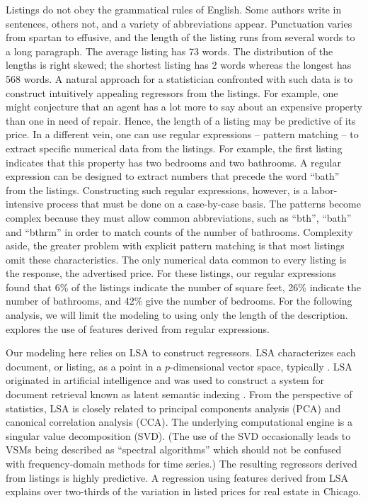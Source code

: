 \documentclass[12pt]{article}
\begin{document}
 \noindent
 Listings do not obey the grammatical rules of English.  Some authors write in
 sentences, others not, and a variety of abbreviations appear.  Punctuation
 varies from spartan to effusive, and the length of the listing runs from
 several words to a long paragraph.  The average listing has 73 words. The
 distribution of the lengths is right skewed; the shortest listing has 2 words
 whereas the longest has 568 words.  A natural approach for a statistician
 confronted with such data is to construct intuitively appealing regressors from
 the listings.  For example, one might conjecture that an agent has a lot more
 to say about an expensive property than one in need of repair.  Hence, the
 length of a listing may be predictive of its price.  In a different vein, one
 can use regular expressions -- pattern matching -- to extract specific
 numerical data from the listings.  For example, the first listing indicates
 that this property has two bedrooms and two bathrooms.  A regular expression
 can be designed to extract numbers that precede the word ``bath'' from the
 listings.  Constructing such regular expressions, however, is a labor-intensive
 process that must be done on a case-by-case basis.  The patterns become complex
 because they must allow common abbreviations, such as ``bth'', ``bath'' and
 ``bthrm'' in order to match counts of the number of bathrooms.  Complexity
 aside, the greater problem with explicit pattern matching is that most listings
 omit these characteristics.  The only numerical data common to every listing is
 the response, the advertised price.  For these listings, our regular
 expressions found that 6\% of the listings indicate the number of square feet,
 26\% indicate the number of bathrooms, and 42\% give the number of bedrooms.
  For the following analysis, we will limit the modeling to using only the
 length of the description.  \citet{stine13} explores the use of features
 derived from regular expressions.

 
 Our modeling here relies on LSA to construct regressors.  LSA characterizes
 each document, or listing, as a point in a $p$-dimensional vector space,
 typically \Rp.  LSA originated in artificial intelligence and was used to
 construct a system for document retrieval known as latent semantic indexing
 \citep{deerwester88}.  From the perspective of statistics, LSA is closely
 related to principal components analysis (PCA) and canonical correlation
 analysis (CCA).  The underlying computational engine is a singular value
 decomposition (SVD).  (The use of the SVD occasionally leads to VSMs being
 described as ``spectral algorithms'' which should not be confused with
 frequency-domain methods for time series.)  The resulting regressors derived
 from listings is highly predictive. A regression using features derived from
 LSA explains over two-thirds of the variation in listed prices for real estate
 in Chicago. 
\end{document}
